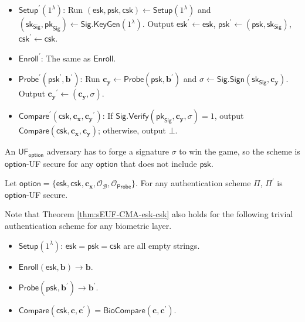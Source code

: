 \begin{itemize}

	\item $\textsf{Setup}^\prime (1^\lambda)$: Run $(\textsf{esk}, \textsf{psk}, \textsf{csk}) \gets \textsf{Setup}(1^\lambda)$ and $(\textsf{sk}_{\textsf{Sig}}, \textsf{pk}_{\textsf{Sig}}) \gets \textsf{Sig.KeyGen}(1^\lambda)$. Output $\textsf{esk}^\prime \gets \textsf{esk}$, $\textsf{psk}^\prime \gets (\textsf{psk}, \textsf{sk}_{\textsf{Sig}})$, $\textsf{csk}^\prime \gets \textsf{csk}$.

	\item $\textsf{Enroll}^\prime$: The same as $\textsf{Enroll}$.

	\item $\textsf{Probe}^\prime (\textsf{psk}^\prime, \mathbf{b}^\prime)$: Run $\mathbf{c_y} \gets \textsf{Probe}(\textsf{psk}, \mathbf{b}^\prime)$ and $\sigma \gets \textsf{Sig.Sign}(\textsf{sk}_{\textsf{Sig}}, \mathbf{c_y})$. Output $\mathbf{c_y}^\prime \gets (\mathbf{c_y}, \sigma)$.

	\item $\textsf{Compare}^\prime (\textsf{csk}, \mathbf{c_x}, \mathbf{c_y}^\prime)$: If $\textsf{Sig.Verify}(\textsf{pk}_{\textsf{Sig}}, \mathbf{c_y}, \sigma) = 1$, output $\textsf{Compare}(\textsf{csk}, \mathbf{c_x}, \mathbf{c_y})$; otherwise, output $\bot$.

\end{itemize}

An $\textsf{UF}_\textsf{option}$ adversary has to forge a signature $\sigma$ to win the game, so the scheme is $\textsf{option}$-UF secure for any $\textsf{option}$ that does not include $\textsf{psk}$. 

\begin{theorem}
\label{thm:sEUF-CMA-esk-csk}
	Let $\textsf{option} = \{ \textsf{esk}, \textsf{csk}, \mathbf{c_x}, \mathcal{O}_\mathcal{B}, \mathcal{O}_{\textsf{Probe}} \}$. For any authentication scheme $\Pi$, $\Pi^\prime$ is $\textsf{option}$-UF secure. 
\end{theorem}

Note that Theorem \ref{thm:sEUF-CMA-esk-csk} also holds for the following trivial authentication scheme for any biometric layer.
\begin{itemize}
	\item $\textsf{Setup} (1^\lambda)$: $\textsf{esk} = \textsf{psk} = \textsf{csk}$ are all empty strings.
	\item $\textsf{Enroll} (\textsf{esk}, \mathbf{b}) \to \mathbf{b}$.
	\item $\textsf{Probe} (\textsf{psk}, \mathbf{b}^\prime) \to \mathbf{b}^\prime$.
	\item $\textsf{Compare} (\textsf{csk}, \mathbf{c}, \mathbf{c}^\prime) = \textsf{BioCompare}(\mathbf{c}, \mathbf{c}^\prime)$.
\end{itemize}


